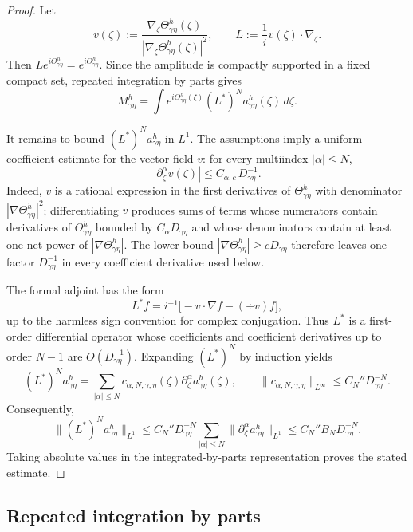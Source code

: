 \begin{proof}
Let
\[
v(\zeta)
:=
\frac{\nabla_\zeta\Theta_{\gamma\eta}^h(\zeta)}
     {|\nabla_\zeta\Theta_{\gamma\eta}^h(\zeta)|^2},
\qquad
L:=\frac{1}{i}v(\zeta)\cdot\nabla_\zeta .
\]
Then $Le^{i\Theta_{\gamma\eta}^h}=e^{i\Theta_{\gamma\eta}^h}$.  Since the amplitude is compactly supported in a fixed compact set, repeated integration by parts gives
\[
M_{\gamma\eta}^h
=
\int e^{i\Theta_{\gamma\eta}^h(\zeta)}
(L^\ast)^N a_{\gamma\eta}^h(\zeta)\,d\zeta .
\]

It remains to bound $(L^\ast)^N a_{\gamma\eta}^h$ in $L^1$.  The assumptions imply a uniform coefficient estimate for the vector field $v$: for every multiindex $|\alpha|\le N$,
\[
|\partial_\zeta^\alpha v(\zeta)|
\le
C_{\alpha,c}\,D_{\gamma\eta}^{-1}.
\]
Indeed, $v$ is a rational expression in the first derivatives of
$\Theta_{\gamma\eta}^h$ with denominator
$|\nabla\Theta_{\gamma\eta}^h|^2$; differentiating $v$ produces sums of terms whose numerators contain derivatives of $\Theta_{\gamma\eta}^h$ bounded by $C_\alpha D_{\gamma\eta}$ and whose denominators contain at least one net power of
$|\nabla\Theta_{\gamma\eta}^h|$.  The lower bound
$|\nabla\Theta_{\gamma\eta}^h|\ge cD_{\gamma\eta}$ therefore leaves one factor $D_{\gamma\eta}^{-1}$ in every coefficient derivative used below.

The formal adjoint has the form
\[
L^\ast f
=
i^{-1}\bigl[-v\cdot\nabla f-(\div v)f\bigr],
\]
up to the harmless sign convention for complex conjugation.  Thus $L^\ast$ is a first-order differential operator whose coefficients and coefficient derivatives up to order $N-1$ are $O(D_{\gamma\eta}^{-1})$.  Expanding $(L^\ast)^N$ by induction yields
\[
(L^\ast)^N a_{\gamma\eta}^h
=
\sum_{|\alpha|\le N} c_{\alpha,N,\gamma,\eta}(\zeta)
\partial_\zeta^\alpha a_{\gamma\eta}^h(\zeta),
\qquad
\|c_{\alpha,N,\gamma,\eta}\|_{L^\infty}
\le
C_N''D_{\gamma\eta}^{-N}.
\]
Consequently,
\[
\|(L^\ast)^N a_{\gamma\eta}^h\|_{L^1}
\le
C_N''D_{\gamma\eta}^{-N}
\sum_{|\alpha|\le N}\|\partial_\zeta^\alpha a_{\gamma\eta}^h\|_{L^1}
\le
C_N''B_ND_{\gamma\eta}^{-N}.
\]
Taking absolute values in the integrated-by-parts representation proves the stated estimate.
\end{proof}

\subsection{Repeated integration by parts}

